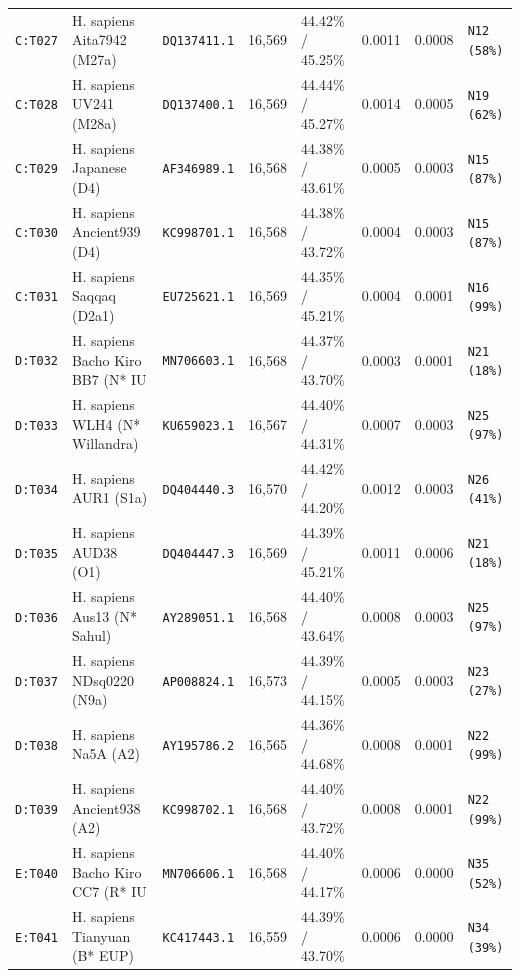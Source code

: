 \documentclass[10pt,letterpaper]{article}
\begin{document}
\begin{longtable}{llllllll}
\texttt{C:T027} & H. sapiens Aita7942 (M27a) & \texttt{DQ137411.1} & 16,569 & 44.42\% / 45.25\% & 0.0011 & 0.0008 & \texttt{N12 (58\%)} \\
\texttt{C:T028} & H. sapiens UV241 (M28a) & \texttt{DQ137400.1} & 16,569 & 44.44\% / 45.27\% & 0.0014 & 0.0005 & \texttt{N19 (62\%)} \\
\texttt{C:T029} & H. sapiens Japanese (D4) & \texttt{AF346989.1} & 16,568 & 44.38\% / 43.61\% & 0.0005 & 0.0003 & \texttt{N15 (87\%)} \\
\texttt{C:T030} & H. sapiens Ancient939 (D4) & \texttt{KC998701.1} & 16,568 & 44.38\% / 43.72\% & 0.0004 & 0.0003 & \texttt{N15 (87\%)} \\
\texttt{C:T031} & H. sapiens Saqqaq (D2a1) & \texttt{EU725621.1} & 16,569 & 44.35\% / 45.21\% & 0.0004 & 0.0001 & \texttt{N16 (99\%)} \\
\texttt{D:T032} & H. sapiens Bacho Kiro BB7 (N* IU & \texttt{MN706603.1} & 16,568 & 44.37\% / 43.70\% & 0.0003 & 0.0001 & \texttt{N21 (18\%)} \\
\texttt{D:T033} & H. sapiens WLH4 (N* Willandra) & \texttt{KU659023.1} & 16,567 & 44.40\% / 44.31\% & 0.0007 & 0.0003 & \texttt{N25 (97\%)} \\
\texttt{D:T034} & H. sapiens AUR1 (S1a) & \texttt{DQ404440.3} & 16,570 & 44.42\% / 44.20\% & 0.0012 & 0.0003 & \texttt{N26 (41\%)} \\
\texttt{D:T035} & H. sapiens AUD38 (O1) & \texttt{DQ404447.3} & 16,569 & 44.39\% / 45.21\% & 0.0011 & 0.0006 & \texttt{N21 (18\%)} \\
\texttt{D:T036} & H. sapiens Aus13 (N* Sahul) & \texttt{AY289051.1} & 16,568 & 44.40\% / 43.64\% & 0.0008 & 0.0003 & \texttt{N25 (97\%)} \\
\texttt{D:T037} & H. sapiens NDsq0220 (N9a) & \texttt{AP008824.1} & 16,573 & 44.39\% / 44.15\% & 0.0005 & 0.0003 & \texttt{N23 (27\%)} \\
\texttt{D:T038} & H. sapiens Na5A (A2) & \texttt{AY195786.2} & 16,565 & 44.36\% / 44.68\% & 0.0008 & 0.0001 & \texttt{N22 (99\%)} \\
\texttt{D:T039} & H. sapiens Ancient938 (A2) & \texttt{KC998702.1} & 16,568 & 44.40\% / 43.72\% & 0.0008 & 0.0001 & \texttt{N22 (99\%)} \\
\texttt{E:T040} & H. sapiens Bacho Kiro CC7 (R* IU & \texttt{MN706606.1} & 16,568 & 44.40\% / 44.17\% & 0.0006 & 0.0000 & \texttt{N35 (52\%)} \\
\texttt{E:T041} & H. sapiens Tianyuan (B* EUP) & \texttt{KC417443.1} & 16,559 & 44.39\% / 43.70\% & 0.0006 & 0.0000 & \texttt{N34 (39\%)} \\

\end{longtable}
\end{document}
